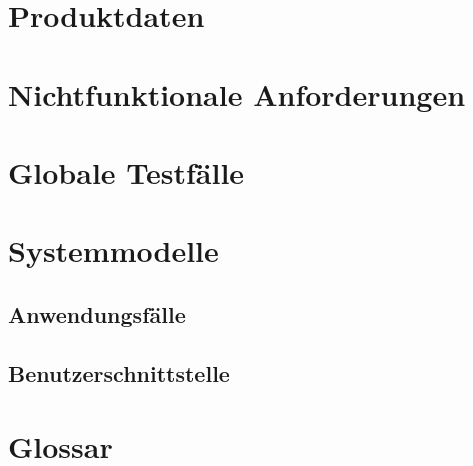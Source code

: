 \documentclass[parskip=full]{scrartcl}
\begin{document}
\section{Produktdaten}

\section{Nichtfunktionale Anforderungen}

\section{Globale Testf\"alle}

\section{Systemmodelle}
\subsection{Anwendungsf\"alle}
\subsection{Benutzerschnittstelle}

\section{Glossar}
\end{document}
